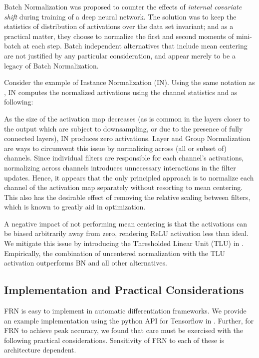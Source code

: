 \documentclass[10pt,twocolumn,letterpaper]{article}
\newcommand{\papername}{FRN}
\newcommand{\batchnorm}{BN}
\begin{document}
Batch Normalization was proposed to counter the effects of \emph{internal covariate shift} during training of a deep neural network. The solution was to keep the statistics of distribution of activations over the data set invariant; and as a practical matter, they choose to normalize the first and second moments of mini-batch at each step. Batch independent alternatives that include mean centering are not justified by any particular consideration, and appear merely to be a legacy of Batch Normalization.

Consider the example of Instance Normalization (IN). Using the same notation as , IN computes the  normalized activations using the channel statistics  and  as following:

As the size of the activation map decreases (as is common in the layers closer to the output which are subject to downsampling, or due to the presence of fully connected layers), IN produces zero activations. Layer and Group Normalization are ways to circumvent this issue by normalizing across (all or subset of) channels. Since individual filters are responsible for each channel's activations, normalizing across channels introduces unnecessary interactions in the filter updates. Hence, it appears that the only principled approach is to normalize each channel of the activation map separately without resorting to mean centering. This also has the desirable effect of removing the relative scaling between filters, which is known to greatly aid in optimization.

A negative impact of not performing mean centering is that the activations can be biased arbitrarily away from zero, rendering ReLU activation less than ideal. We mitigate this issue by introducing the Thresholded Linear Unit (TLU) in . Empirically, the combination of uncentered normalization with the TLU activation outperforms \batchnorm{} and all other alternatives.


\subsection{Implementation and Practical Considerations}
\label{sec:learning_rate}

\papername{} is easy to implement in automatic differentiation frameworks. We provide an example implementation using the python API for Tensorflow in . Further, for FRN to achieve peak accuracy, we found that care must be exercised with the following practical considerations. Sensitivity of FRN to each of these is architecture dependent.
\end{document}
